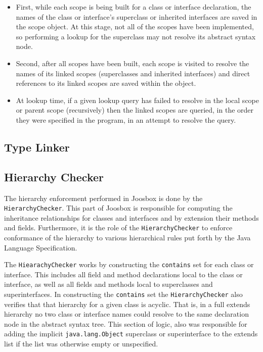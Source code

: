 \documentclass[letterpaper]{article}
\begin{document}
  \begin{itemize}
    \item First, while each scope is being built for a class or interface
    declaration, the names of the class or interface's superclass or inherited
    interfaces are saved in the scope object. At this stage, not all of the
    scopes have been implemented, so performing a lookup for the superclass
    may not resolve its abstract syntax node.

    \item Second, after all scopes have been built, each scope is visited to
    resolve the names of its linked scopes (superclasses and inherited interfaces)
    and direct references to its linked scopes are saved within the object.

    \item At lookup time, if a given lookup query has failed to resolve in
    the local scope or parent scope (recursively) then the linked scopes are
    queried, in the order they were specified in the program, in an attempt
    to resolve the query.
  \end{itemize}

  \subsection{Type Linker}

  \subsection{Hierarchy Checker}

  The hierarchy enforcement performed in Joosbox is done by the
  {\tt HierarchyChecker}. This part of Joosbox is responsible for computing the
  inheritance relationships for classes and interfaces and by extension their
  methods and fields. Furthermore, it is the role of the {\tt HierarchyChecker}
  to enforce conformance of the hierarchy to various hierarchical rules put
  forth by the Java Language Specification.

  The {\tt HiearachyChecker} works by constructing the {\tt contains} set for
  each class or interface. This includes all field and method declarations local
  to the class or interface, as well as all fields and methods local to
  superclasses and superinterfaces. In constructing the {\tt contains} set the
  {\tt HierarchyChecker} also verifies that that hierarchy for a given class is
  acyclic. That is, in a full extends hierarchy no two class or interface names
  could resolve to the same declaration node in the abstract syntax tree. This
  section of logic, also was responsible for adding the implicit
  {\tt java.lang.Object} superclass or superinterface to the extends list if the
  list was otherwise empty or unspecified.
\end{document}
